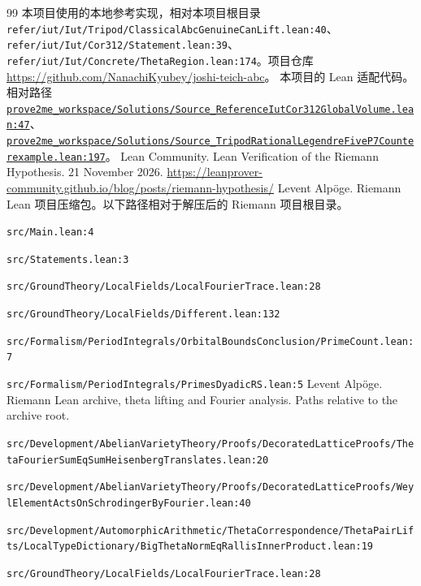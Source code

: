 \documentclass[UTF8,fontset=none,zihao=-4,a4paper]{ctexart}
\newcommand{\project}[2]{\href{https://github.com/NanachiKyubey/joshi-teich-abc/blob/47862524e9b23a21ca01cfeb112b342dffaac78a/#1}{\nolinkurl{#2}}}
\begin{document}
\begin{thebibliography}{99}
 本项目使用的本地参考实现，相对本项目根目录 \nolinkurl{refer/iut/Iut/Tripod/ClassicalAbcGenuineCanLift.lean:40}、\nolinkurl{refer/iut/Iut/Cor312/Statement.lean:39}、\nolinkurl{refer/iut/Iut/Concrete/ThetaRegion.lean:174}。项目仓库 \url{https://github.com/NanachiKyubey/joshi-teich-abc}。
 本项目的 Lean 适配代码。相对路径 \project{prove2me_workspace/Solutions/Source_ReferenceIutCor312GlobalVolume.lean\#L47}{prove2me_workspace/Solutions/Source_ReferenceIutCor312GlobalVolume.lean:47}、\project{prove2me_workspace/Solutions/Source_TripodRationalLegendreFiveP7Counterexample.lean\#L197}{prove2me_workspace/Solutions/Source_TripodRationalLegendreFiveP7Counterexample.lean:197}。
 Lean Community. Lean Verification of the Riemann Hypothesis. 21 November 2026. \url{https://leanprover-community.github.io/blog/posts/riemann-hypothesis/}
 Levent Alpöge. Riemann Lean 项目压缩包。以下路径相对于解压后的 Riemann 项目根目录。\par
\nolinkurl{src/Main.lean:4}\par
\nolinkurl{src/Statements.lean:3}\par
\nolinkurl{src/GroundTheory/LocalFields/LocalFourierTrace.lean:28}\par
\nolinkurl{src/GroundTheory/LocalFields/Different.lean:132}\par
\nolinkurl{src/Formalism/PeriodIntegrals/OrbitalBoundsConclusion/PrimeCount.lean:7}\par
\nolinkurl{src/Formalism/PeriodIntegrals/PrimesDyadicRS.lean:5}
 Levent Alpöge. Riemann Lean archive, theta lifting and Fourier analysis. Paths relative to the archive root.\par
\nolinkurl{src/Development/AbelianVarietyTheory/Proofs/DecoratedLatticeProofs/ThetaFourierSumEqSumHeisenbergTranslates.lean:20}\par
\nolinkurl{src/Development/AbelianVarietyTheory/Proofs/DecoratedLatticeProofs/WeylElementActsOnSchrodingerByFourier.lean:40}\par
\nolinkurl{src/Development/AutomorphicArithmetic/ThetaCorrespondence/ThetaPairLifts/LocalTypeDictionary/BigThetaNormEqRallisInnerProduct.lean:19}\par
\nolinkurl{src/GroundTheory/LocalFields/LocalFourierTrace.lean:28}
\end{thebibliography}
\endgroup
\end{document}
